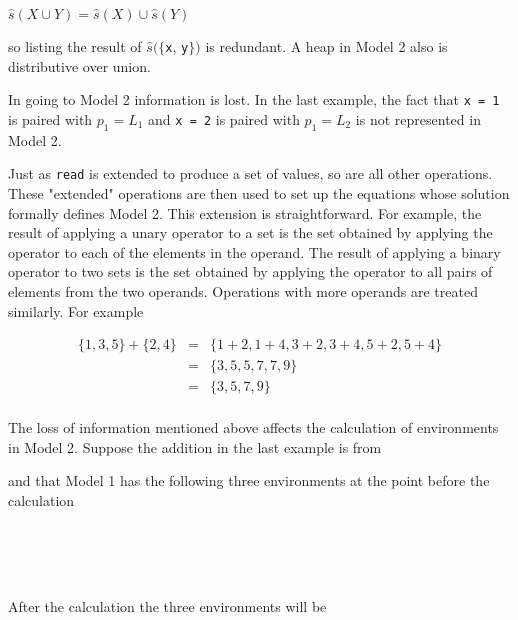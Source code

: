 $\hat{s}(X \cup Y) = \hat{s}(X) \cup \hat{s}(Y)$

\noindent
so listing the result of $\hat{s}(\{$\texttt{x}, \texttt{y}$\})$ is
redundant. A heap in Model 2 also is distributive over union.

In going to Model 2 information is lost. In the last example, the fact
that \texttt{x = 1} is paired with $p_1 =L_1$ and \texttt{x = 2} is
paired with $p_1 = L_2$ is not represented in Model 2.

Just as \texttt{read} is extended to produce a set of values, so are
all other operations. These "extended" operations are then used to set
up the equations whose solution formally defines Model 2. This
extension is straightforward. For example, the result of applying a
unary operator to a set is the set obtained by applying the operator
to each of the elements in the operand. The result of applying a
binary operator to two sets is the set obtained by applying the
operator to all pairs of elements from the two operands. Operations
with more operands are treated similarly. For example

\begin{eqnarray*}
\{1, 3, 5\} + \{2, 4\} & = & \{1 + 2, 1 + 4, 3 + 2, 3 + 4, 5 + 2, 5 + 4\}\\
                       & = & \{3, 5, 5, 7, 7, 9\}\\
                       & = & \{3, 5, 7, 9\}\\
\end{eqnarray*}

The loss of information mentioned above affects the calculation of
environments in Model 2. Suppose the addition in the last example is
from


\noindent and that Model 1 has the following three environments at the
point before the calculation

\goodbreak
\begin{iconcode}
\>[x = 1, y = 2, z = 0]\\
\>[x = 3, y = 2, z = 0]\\
\>[x = 5, y = 4, z = 0]\\
\end{iconcode}


After the calculation the three environments will be 

\goodbreak
\begin{iconcode}
\>[x = 1, y = 2, z = 3]\\
\>[x = 3, y = 2, z = 5]\\
\>[x = 5, y = 4, z = 9]\\
\end{iconcode}

